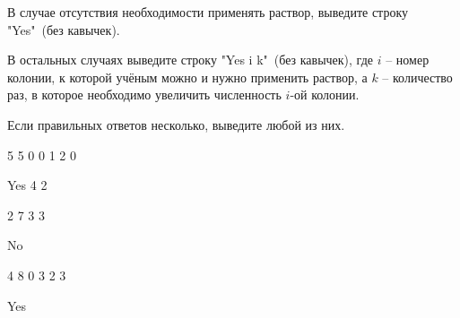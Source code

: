 В случае отсутствия необходимости применять раствор, выведите строку "Yes"\ (без кавычек).

В остальных случаях выведите строку "Yes i k"\ (без кавычек), где $i$ -- номер колонии, к которой учёным можно и нужно применить раствор, а $k$ -- количество раз, в которое необходимо увеличить численность $i$-ой колонии.

Если правильных ответов несколько, выведите любой из них.

\exampleSection


\begin{myverbbox}[\small]{\vinput}
5 5
0 0 1 2 0
\end{myverbbox}
\begin{myverbbox}[\small]{\voutput}
Yes 4 2
\end{myverbbox}


\begin{myverbbox}[\small]{\vinput}
2 7
3 3
\end{myverbbox}
\begin{myverbbox}[\small]{\voutput}
No
\end{myverbbox}


\begin{myverbbox}[\small]{\vinput}
4 8
0 3 2 3
\end{myverbbox}
\begin{myverbbox}[\small]{\voutput}
Yes
\end{myverbbox}


